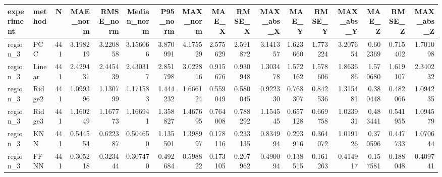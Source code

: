 \begin{tabular}{llrrrrrrrrrrrrrrr}
\toprule
experiment & method & N & MAE_norm & RMSE_norm & Median_norm & P95_norm & MAX_norm & MAE_X & RMSE_X & MAX_abs_X & MAE_Y & RMSE_Y & MAX_abs_Y & MAE_Z & RMSE_Z & MAX_abs_Z \\
\midrule
region_3 & PCC & 441 & 3.198219 & 3.220858 & 3.156066 & 3.870991 & 4.175529 & 2.575629 & 2.591872 & 3.141357 & 1.623660 & 1.773224 & 3.207654 & 0.602369 & 0.715402 & 1.701098 \\
region_3 & Linear & 441 & 2.429431 & 2.445439 & 2.430317 & 2.851798 & 3.022816 & 0.915676 & 0.930948 & 1.303478 & 1.572162 & 1.578606 & 1.863686 & 1.570680 & 1.619107 & 2.340232 \\
region_3 & Ridge2 & 441 & 1.099396 & 1.130799 & 1.171583 & 1.444232 & 1.666124 & 0.559049 & 0.580045 & 0.922330 & 0.768307 & 0.842536 & 1.315481 & 0.380448 & 0.482066 & 1.094235 \\
region_3 & Ridge3 & 441 & 1.160249 & 1.167773 & 1.166941 & 1.358827 & 1.467695 & 0.764008 & 0.788292 & 1.154545 & 0.657128 & 0.669758 & 1.023931 & 0.483441 & 0.541955 & 1.094579 \\
region_3 & KNN & 441 & 0.544554 & 0.622387 & 0.504650 & 1.135501 & 1.398997 & 0.178116 & 0.233135 & 0.834994 & 0.293916 & 0.364072 & 1.019126 & 0.370596 & 0.447733 & 1.070644 \\
region_3 & FFNN & 441 & 0.305218 & 0.323444 & 0.307470 & 0.492684 & 0.598822 & 0.173105 & 0.207962 & 0.490094 & 0.138515 & 0.161263 & 0.414917 & 0.157581 & 0.188048 & 0.409741 \\
\bottomrule
\end{tabular}
